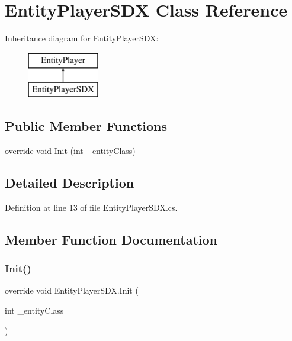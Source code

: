 \hypertarget{class_entity_player_s_d_x}{}\section{Entity\+Player\+S\+DX Class Reference}
\label{class_entity_player_s_d_x}
Inheritance diagram for Entity\+Player\+S\+DX\+:\begin{figure}[H]
\begin{center}
\leavevmode
\includegraphics[height=2.000000cm]{class_entity_player_s_d_x}
\end{center}
\end{figure}
\subsection*{Public Member Functions}
\begin{DoxyCompactItemize}
\item 
override void \mbox{\hyperlink{class_entity_player_s_d_x_a3ca3a3501b3ecb215501b3c685f3da08}{Init}} (int \+\_\+entity\+Class)
\end{DoxyCompactItemize}


\subsection{Detailed Description}


Definition at line 13 of file Entity\+Player\+S\+D\+X.\+cs.



\subsection{Member Function Documentation}
\mbox{\label{class_entity_player_s_d_x_a3ca3a3501b3ecb215501b3c685f3da08}} 
\subsubsection{\texorpdfstring{Init()}{Init()}}
{\footnotesize\ttfamily override void Entity\+Player\+S\+D\+X.\+Init (\begin{DoxyParamCaption}\item[{int}]{\+\_\+entity\+Class }\end{DoxyParamCaption})}



